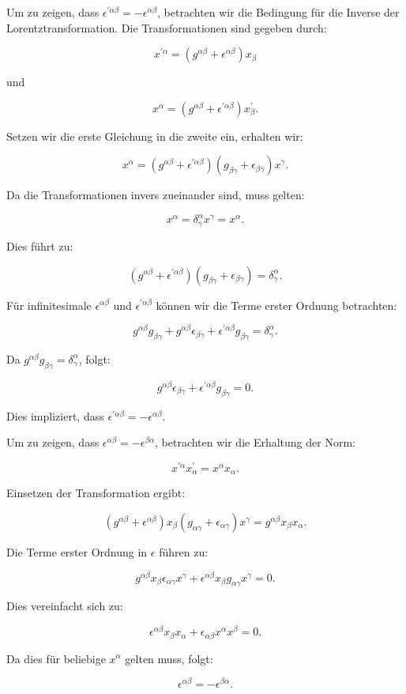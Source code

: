 Um zu zeigen, dass $\epsilon^{\prime \alpha \beta} = - \epsilon^{\alpha \beta}$, betrachten wir die Bedingung für die Inverse der Lorentztransformation. Die Transformationen sind gegeben durch:

\[
x^{\prime \alpha} = \left(g^{\alpha \beta} + \epsilon^{\alpha \beta}\right) x_\beta
\]

und

\[
x^\alpha = \left(g^{\alpha \beta} + \epsilon^{\prime \alpha \beta}\right) x_\beta^{\prime}.
\]

Setzen wir die erste Gleichung in die zweite ein, erhalten wir:

\[
x^\alpha = \left(g^{\alpha \beta} + \epsilon^{\prime \alpha \beta}\right) \left(g_{\beta \gamma} + \epsilon_{\beta \gamma}\right) x^\gamma.
\]

Da die Transformationen invers zueinander sind, muss gelten:

\[
x^\alpha = \delta^\alpha_\gamma x^\gamma = x^\alpha.
\]

Dies führt zu:

\[
\left(g^{\alpha \beta} + \epsilon^{\prime \alpha \beta}\right) \left(g_{\beta \gamma} + \epsilon_{\beta \gamma}\right) = \delta^\alpha_\gamma.
\]

Für infinitesimale $\epsilon^{\alpha \beta}$ und $\epsilon^{\prime \alpha \beta}$ können wir die Terme erster Ordnung betrachten:

\[
g^{\alpha \beta} g_{\beta \gamma} + g^{\alpha \beta} \epsilon_{\beta \gamma} + \epsilon^{\prime \alpha \beta} g_{\beta \gamma} = \delta^\alpha_\gamma.
\]

Da $g^{\alpha \beta} g_{\beta \gamma} = \delta^\alpha_\gamma$, folgt:

\[
g^{\alpha \beta} \epsilon_{\beta \gamma} + \epsilon^{\prime \alpha \beta} g_{\beta \gamma} = 0.
\]

Dies impliziert, dass $\epsilon^{\prime \alpha \beta} = - \epsilon^{\alpha \beta}$.

Um zu zeigen, dass $\epsilon^{\alpha \beta} = -\epsilon^{\beta \alpha}$, betrachten wir die Erhaltung der Norm:

\[
x^{\prime \alpha} x^{\prime}_\alpha = x^\alpha x_\alpha.
\]

Einsetzen der Transformation ergibt:

\[
\left(g^{\alpha \beta} + \epsilon^{\alpha \beta}\right) x_\beta \left(g_{\alpha \gamma} + \epsilon_{\alpha \gamma}\right) x^\gamma = g^{\alpha \beta} x_\beta x_\alpha.
\]

Die Terme erster Ordnung in $\epsilon$ führen zu:

\[
g^{\alpha \beta} x_\beta \epsilon_{\alpha \gamma} x^\gamma + \epsilon^{\alpha \beta} x_\beta g_{\alpha \gamma} x^\gamma = 0.
\]

Dies vereinfacht sich zu:

\[
\epsilon^{\alpha \beta} x_\beta x_\alpha + \epsilon_{\alpha \beta} x^\alpha x^\beta = 0.
\]

Da dies für beliebige $x^\alpha$ gelten muss, folgt:

\[
\epsilon^{\alpha \beta} = -\epsilon^{\beta \alpha}.
\]